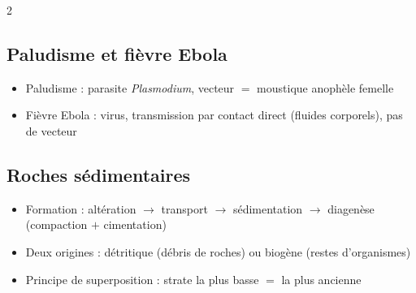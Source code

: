 \begin{multicols}{2}
\subsection*{\color{onbo}Paludisme et fièvre Ebola}
\begin{itemize}
\item Paludisme : parasite \textit{Plasmodium}, vecteur $=$ moustique anophèle
femelle
\item Fièvre Ebola : virus, transmission par contact direct (fluides corporels),
pas de vecteur
\end{itemize}

\subsection*{\color{onbo}Roches sédimentaires}
\begin{itemize}
\item Formation : altération $\to$ transport $\to$ sédimentation $\to$ diagenèse
(compaction $+$ cimentation)
\item Deux origines : détritique (débris de roches) ou biogène (restes
d'organismes)
\item Principe de superposition : strate la plus basse $=$ la plus ancienne
\end{itemize}

\end{multicols}
